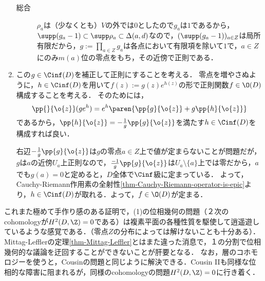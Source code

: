 \documentclass[uplatex, dvipdfmx]{jsreport}
\begin{document}
\begin{Proof}
\begin{enumerate}
\begin{description}
        \item[総合] $\rho_a$は（少なくとも）$V$の外では$0$としたので$g_a$は$1$であるから，
        $\supp(g_a-1)\subset\supp\rho_a\subset\Delta(a,d)$なので，$(\supp(g_a-1))_{a\in Z}$は局所有限だから，$g:=\prod_{a\in Z}g_a$は各点において有限項を除いて$1$で，$a\in Z$にのみ$m(a)$位の零点をもち，その近傍で正則である．
    \end{description}
    \item この$g\in\Cinf(D)$を補正して正則にすることを考える．
    零点を増やさぬように，$h\in\Cinf(D)$を用いて$f(z):=g(z)e^{h(z)}$の形で正則関数$f\in\O(D)$構成することを考える．
    そのためには，
    \[\pp{}{\o{z}}(ge^h)=e^h\paren{\pp{g}{\o{z}}+g\pp{h}{\o{z}}}\]
    であるから，$\pp{h}{\o{z}}=-\frac{1}{g}\pp{g}{\o{z}}$を満たす$h\in\Cinf(D)$を構成すれば良い．

    右辺$-\frac{1}{g}\pp{g}{\o{z}}$は$g$の零点$a\in Z$上で値が定まらないことが問題だが，
    $g$は$a$の近傍$U_a$上正則なので，$\frac{-1}{g}\pp{g}{\o{z}}$は$U_a\setminus\{a\}$上では零だから，$a$でも$g(a)=0$と定めると，$D$全体で$\Cinf$級に定まっている．
    よって，Cauchy-Riemann作用素の全射性\ref{thm-Cauchy-Riemann-operator-is-epic}より，$h\in\Cinf(D)$が取れる．よって，$f\in\O(D)$が定まる．
    \end{enumerate}
\end{Proof}
\begin{remarks}
    これまた極めて手作り感のある証明で，(1)の位相幾何の問題（２次のcohomologyが$H^2(D,\Z)=0$である）は複素平面の各種性質を駆使して逍遥遊しているような感覚である．（零点$Z$の分布によっては解けないことも十分ある）．
    Mittag-Lefflerの定理\ref{thm-Mittag-Leffler}とはまた違った消息で，１の分割で位相幾何的な議論を迂回することができないことが肝要となる．
    なお，層のコホモロジーを使うと，Cousinの問題と同じように解決できる．Cousin IIも同様な位相的な障害に阻まれるが，同様のcohomologyの問題$H^2(D,\Z)=0$に行き着く．
\end{remarks}
\end{document}

